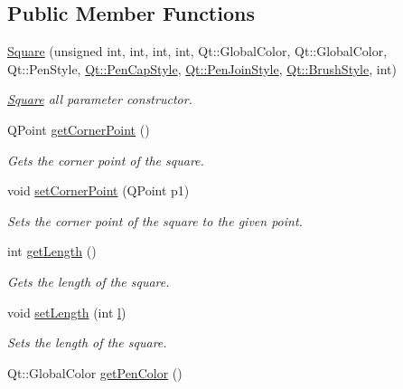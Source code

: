 \subsection*{Public Member Functions}
\begin{DoxyCompactItemize}
\item 
\hyperlink{classSquare_a2a877745d97b47cef1bb9473b183b074}{Square} (unsigned int, int, int, int, Qt\+::\+Global\+Color, Qt\+::\+Global\+Color, Qt\+::\+Pen\+Style, \hyperlink{shape__input__file__specs_8txt_a622efdcfef6789d4367974d2fe79019e}{Qt\+::\+Pen\+Cap\+Style}, \hyperlink{shape__input__file__specs_8txt_a007db2043c6063881de2043c05c9c4a9}{Qt\+::\+Pen\+Join\+Style}, \hyperlink{shape__input__file__specs_8txt_ad07f6fe6c28dcb0b3bdc324a72d0051f}{Qt\+::\+Brush\+Style}, int)
\begin{DoxyCompactList}\small\item\em \hyperlink{classSquare}{Square} all parameter constructor. \end{DoxyCompactList}\item 
Q\+Point \hyperlink{classSquare_a2fdd4544900c08c881c4bf4effe0b974}{get\+Corner\+Point} ()
\begin{DoxyCompactList}\small\item\em Gets the corner point of the square. \end{DoxyCompactList}\item 
void \hyperlink{classSquare_acfd205cb2fe02845e3ece8c9a1244943}{set\+Corner\+Point} (Q\+Point p1)
\begin{DoxyCompactList}\small\item\em Sets the corner point of the square to the given point. \end{DoxyCompactList}\item 
int \hyperlink{classSquare_a6d8a8d8ec4383ebefe4c274f189c6a79}{get\+Length} ()
\begin{DoxyCompactList}\small\item\em Gets the length of the square. \end{DoxyCompactList}\item 
void \hyperlink{classSquare_a6a04c5639dc3cd6501a1d80ad54f4171}{set\+Length} (int \hyperlink{shape__input__file__specs_8txt_a2e02238fe11bc76d2a69c565c7391545}{l})
\begin{DoxyCompactList}\small\item\em Sets the length of the square. \end{DoxyCompactList}\item 
Qt\+::\+Global\+Color \hyperlink{classSquare_a8e9f690383213cb901883ba0fd008818}{get\+Pen\+Color} ()

\end{DoxyCompactItemize}
